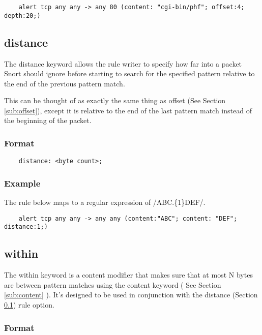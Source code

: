 \documentclass[english]{report}
\begin{document}
\begin{verbatim}
    alert tcp any any -> any 80 (content: "cgi-bin/phf"; offset:4; depth:20;)
\end{verbatim}

\subsection{distance}
\label{sub:Distance}

The distance keyword allows the rule writer to specify how far into a packet
Snort should ignore before starting to search for the specified pattern
relative to the end of the previous pattern match.  

This can be thought of as exactly the same thing as offset (See Section
\ref{sub:offset}), except it is relative to the end of the last pattern match
instead of the beginning of the packet.

\subsubsection{Format}

\begin{verbatim}
    distance: <byte count>;
\end{verbatim}

\subsubsection{Example}

The rule below maps to a regular expression of /ABC.\{1\}DEF/.

\begin{verbatim}
    alert tcp any any -> any any (content:"ABC"; content: "DEF"; distance:1;)
\end{verbatim}

\subsection{within}
\label{sub:Within}

The within keyword is a content modifier that makes sure that at most N bytes
are between pattern matches using the content keyword ( See Section
\ref{sub:content} ).  It's designed to be used in conjunction with the distance
(Section \ref{sub:Distance}) rule option.

\subsubsection{Format}
\end{document}
